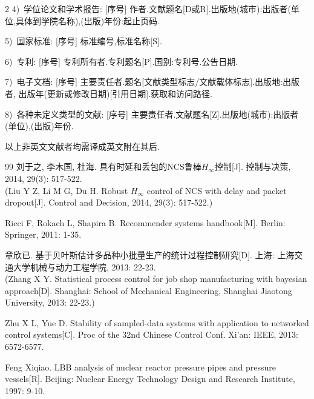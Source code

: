 \documentclass[authordraft]{ctacn}%
\begin{document}
\begin{multicols}{2}
4)~学位论文和学术报告:
[序号] 作者.\;文献题名[D或R].\;出版地(城市):出版者(单位,具体到学院名称),(出版)年份:起止页码.

5)~国家标准:
[序号] 标准编号,标准名称[S].

6)~专利:
[序号] 专利所有者.\;专利题名[P].\;国别:专利号.\;公告日期.

7)~电子文档:
[序号] 主要责任者.\;题名[文献类型标志/文献载体标志].\;出版地:出版者, 出版年(更新或修改日期)[引用日期].\;获取和访问路径.

8)~各种未定义类型的文献: [序号] 主要责任者.\;文献题名[Z].\;出版地(城市):出版者(单位),(出版)年份.

以上非英文文献者均需译成英文附在其后.



\begin{thebibliography}{99}
	\addtolength{\itemsep}{-0.7em}
	刘于之, 李木国, 杜海. 具有时延和丢包的NCS鲁棒$H_{\infty}$控制[J]. 控制与决策, 2014, 29(3): 517-522.\\
	(Liu Y Z, Li M G, Du H. Robust $H_{\infty}$ control of NCS with delay and packet dropout[J]. Control and Decision, 2014, 29(3): 517-522.)
	
	Ricci F, Rokach L, Shapira B. Recommender systems handbook[M]. Berlin: Springer, 2011: 1-35.
	
	章欣已. 基于贝叶斯估计多品种小批量生产的统计过程控制研究[D]. 上海: 上海交通大学机械与动力工程学院, 2013: 22-23.\\
	(Zhang X Y. Statistical process control for job shop manufacturing with bayesian approach[D]. Shanghai: School of Mechanical Engineering, Shanghai Jiaotong University, 2013: 22-23.)
	
	Zhu X L, Yue D. Stability of sampled-data systems with application to networked control systems[C]. Proc of the 32nd Chinese Control Conf. Xi'an: IEEE, 2013: 6572-6577.
	
	Feng Xiqiao. LBB analysis of nuclear reactor pressure pipes and pressure vessels[R]. Beijing: Nuclear Energy Technology Design and Research Institute, 1997: 9-10.
	

\end{thebibliography}
\end{multicols}
\end{document}
